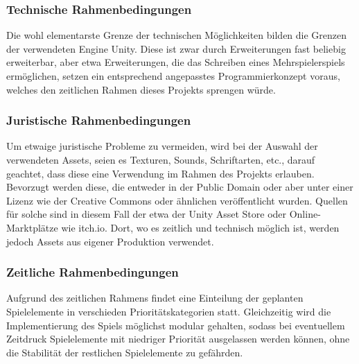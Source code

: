 \documentclass[paper=A4,pagesize=auto,12pt,headinclude=true,footinclude=true,BCOR=0mm,DIV=calc]{scrartcl}
\newcommand{\sectionspace}{
	\vspace{0.5cm}
}
\begin{document}
\subsubsection{Technische Rahmenbedingungen}
Die wohl elementarste Grenze der technischen Möglichkeiten bilden die Grenzen der verwendeten Engine Unity.  Diese ist zwar durch Erweiterungen fast beliebig erweiterbar, aber etwa Erweiterungen, die das Schreiben eines Mehrspielerspiels ermöglichen, setzen ein entsprechend angepasstes Programmierkonzept voraus, welches den zeitlichen Rahmen dieses Projekts sprengen würde.
\subsubsection{Juristische Rahmenbedingungen}
Um etwaige juristische Probleme zu vermeiden, wird bei der Auswahl der verwendeten Assets, seien es Texturen, Sounds, Schriftarten, etc., darauf geachtet, dass diese eine Verwendung im Rahmen des Projekts erlauben. Bevorzugt werden diese, die entweder in der Public Domain oder aber unter einer Lizenz wie der Creative Commons \cite{cc_licenses} oder ähnlichen veröffentlicht wurden. Quellen für solche sind in diesem Fall der etwa der Unity Asset Store oder Online-Marktplätze wie itch.io. Dort, wo es zeitlich und technisch möglich ist, werden jedoch Assets aus eigener Produktion verwendet.
\subsubsection{Zeitliche Rahmenbedingungen}
Aufgrund des zeitlichen Rahmens findet eine Einteilung der geplanten Spielelemente in verschieden Prioritätskategorien statt. Gleichzeitig wird die Implementierung des Spiels möglichst modular gehalten, sodass bei eventuellem Zeitdruck Spielelemente mit niedriger Priorität ausgelassen werden können, ohne die Stabilität der restlichen Spielelemente zu gefährden.

\sectionspace
\end{document}
